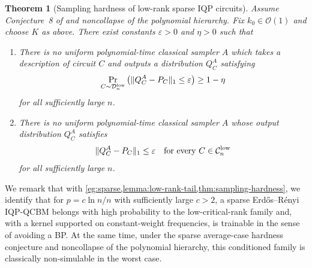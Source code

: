 \documentclass{article}
\theoremstyle{plain}
\newtheorem{theorem}{Theorem}[section]
\theoremstyle{definition}
\theoremstyle{remark}
\begin{document}
\begin{theorem}[Sampling hardness of low-rank sparse IQP circuits]
\label{thm:sampling-hardness}
Assume Conjecture~8 of \cite{Bremner17} and noncollapse of the polynomial
hierarchy. Fix $k_0\in\mathcal{O}(1)$ and choose $K$ as above. There exist constants $\varepsilon>0$ and $\eta>0$ such that
\begin{enumerate}
    \item There is no uniform polynomial-time classical sampler $A$ which takes a description of circuit $C$ and outputs a distribution $Q_C^A$ satisfying
    \begin{equation} \label{eq:low-rank-average-hardness}
    \Pr_{C\sim\mathcal D_n^{\rm low}}\left(\|Q_C^A-P_C\|_1\leq\varepsilon \right) \geq 1 - \eta
    \end{equation}
    for all sufficiently large $n$.
    \item There is no uniform polynomial-time classical sampler $A$ whose output distribution $Q_C^A$ satisfies
    \begin{equation}
    \|Q_C^A-P_C\|_1\leq\varepsilon \quad\text{for every } C\in\mathcal{C}_n^{\rm low}
    \label{eq:low-rank-sampling-error}
    \end{equation}
    for all sufficiently large $n$.
\end{enumerate}
\end{theorem}

We remark that with \cref{eg:sparse,lemma:low-rank-tail,thm:sampling-hardness}, we identify that for $p=c\ln n/n$ with sufficiently large $c>2$, a sparse Erd\H{o}s--R\'enyi IQP-QCBM belongs with high probability to the low-critical-rank family and, with a kernel supported on constant-weight frequencies, is trainable in the sense of avoiding a BP. At the same time, under the sparse average-case hardness conjecture and noncollapse of the polynomial hierarchy, this conditioned family is classically non-simulable in the worst case.
\end{document}
